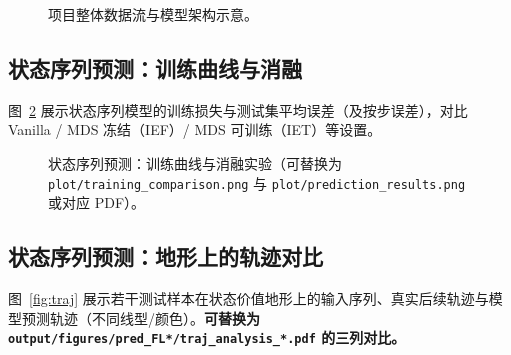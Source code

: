\documentclass[UTF8,11pt]{ctexart}
\begin{document}
\begin{figure}[H]
    \centering
    \caption{项目整体数据流与模型架构示意。}
    \label{fig:arch}
\end{figure}

\subsection{状态序列预测：训练曲线与消融}
图~\ref{fig:training} 展示状态序列模型的训练损失与测试集平均误差（及按步误差），对比 Vanilla / MDS 冻结（IEF）/ MDS 可训练（IET）等设置。

\begin{figure}[H]
    \centering
    \begin{minipage}{0.48\linewidth}
        \centering
    \end{minipage}
    \hfill
    \begin{minipage}{0.48\linewidth}
        \centering
        \fbox{\parbox{\linewidth}{\centering\vspace{2.8cm}\textbf{[右：消融/预测误差对比]}}}
    \end{minipage}
    \caption{状态序列预测：训练曲线与消融实验（可替换为 \texttt{plot/training\_comparison.png} 与 \texttt{plot/prediction\_results.png} 或对应 PDF）。}
    \label{fig:training}
\end{figure}

\subsection{状态序列预测：地形上的轨迹对比}
图~\ref{fig:traj} 展示若干测试样本在状态价值地形上的输入序列、真实后续轨迹与模型预测轨迹（不同线型/颜色）。\textbf{可替换为 \texttt{output/figures/pred\_FL*/traj\_analysis\_*.pdf} 的三列对比。}
\end{document}
